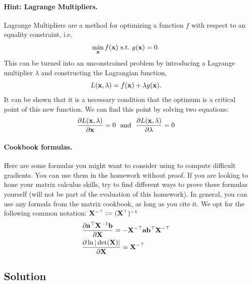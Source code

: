 \documentclass[submit]{harvardml}
\begin{document}
\begin{problem}
\paragraph{Hint: Lagrange Multipliers.} Lagrange Multipliers are a method for
optimizing a function $f$ with respect to an
equality constraint, i.e.
\[\min_{\mathbf{x}} f(\mathbf{x})\ \text{s.t.}\ g(\mathbf{x}) = 0.\]
This can be turned into an unconstrained problem by introducing a
Lagrange multiplier $\lambda$ and constructing the Lagrangian function,
\[L(\mathbf{x}, \lambda) =  f(\mathbf{x}) + \lambda g(\mathbf{x}).\]
It can be shown that it is a necessary condition that the optimum
is a critical point of this new function. We can find this point by solving two equations:
\[\frac{\partial L(\mathbf{x}, \lambda)}{\partial  \mathbf{x}} = 0  \ \ \text{and}\  \  \frac{\partial L(\mathbf{x}, \lambda)}{\partial \lambda} = 0 \]
\paragraph{Cookbook formulas.} Here are some formulas you might want to consider
using to compute difficult gradients. You can use them  in the homework
without proof. If you are looking to hone your matrix calculus skills, try to
find different ways to prove these formulas yourself (will not be part of the
evaluation of this homework). In general, you can use any formula from the matrix cookbook,
as long as you cite it. We opt for the following common notation:
$\mathbf{X}^{-\top} := (\mathbf{X}^{\top})^{-1}$
\begin{align*}
  & \frac{\partial \mathbf{a}^\top \mathbf{X}^{-1} \mathbf{b}}{\partial \mathbf{X}} = - \mathbf{X}^{-\top} \mathbf{a} \mathbf{b}^\top \mathbf{X}^{-\top} \\
  & \frac{\partial \ln | \det (\mathbf{X}) |}{\partial \mathbf{X}} = \mathbf{X}^{-\top}
 \end{align*}
 \end{problem}
\subsection*{Solution}
\newpage
\end{document}

